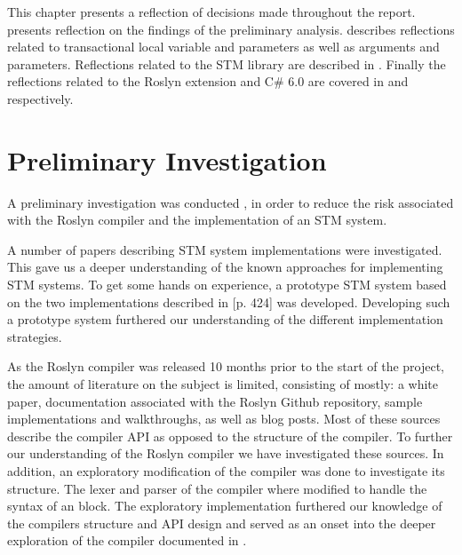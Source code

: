 \makeatletter {}\makeatother
{}
\label{chap:reflection}
This chapter presents a reflection of decisions made throughout the report.  presents reflection on the findings of the preliminary analysis.  describes reflections related to transactional local variable and parameters as well as  arguments and parameters. Reflections related to the \ac{STM} library are described in . Finally the reflections related to the Roslyn extension and C\# 6.0 are covered in  and  respectively. 

\section{Preliminary Investigation}\label{sec:reflection_preliminary}
A preliminary investigation was conducted , in order to reduce the risk associated with the Roslyn compiler and the implementation of an \ac{STM} system. 

A number of papers describing \ac{STM} system implementations were investigated. This gave us a deeper understanding of the known approaches for implementing \ac{STM} systems. To get some hands on experience, a prototype \ac{STM} system based on the two implementations described in \cite{herlihy2012art}[p. 424] was developed. Developing such a prototype system furthered our understanding of the different implementation strategies.

As the Roslyn compiler was released 10 months prior to the start of the project, the amount of literature on the subject is limited, consisting of mostly: a white paper\cite{ng2012roslyn}, documentation associated with the Roslyn Github repository\cite{roslynwiki}, sample implementations and walkthroughs\cite{roslynsamples}, as well as blog posts. Most of these sources describe the compiler \ac{API} as opposed to the structure of the compiler. To further our understanding of the Roslyn compiler we have investigated these sources. In addition, an exploratory modification of the compiler was done to investigate its structure. The lexer and parser of the compiler where modified to handle the syntax of an  block. The exploratory implementation furthered our knowledge of the compilers structure and \ac{API} design and served as an onset into the deeper exploration of the compiler documented in .

